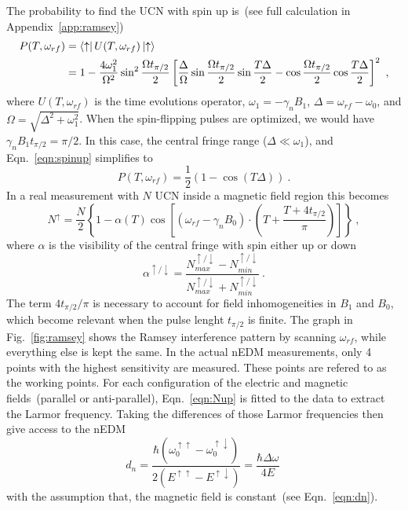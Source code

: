 The probability to find the UCN with spin up is~(see full calculation
in Appendix~\ref{app:ramsey})
\begin{align}
  \label{eqn:spinup}
  P(T, \omega_{rf}) &= \bra{\uparrow} U(T, \omega_{rf}) \ket{\uparrow} \\ \nonumber
  &= 1 - \frac{4 \omega_1^2}{\Omega^2} \sin ^2 \frac{\Omega t_{\pi/2}}{2} \left[ \frac{\Delta}{\Omega} \sin  \frac{\Omega t_{\pi/2}}{2} \sin \frac{T\Delta}{2} - \cos  \frac{\Omega t_{\pi/2}}{2} \cos\frac{T\Delta}{2} \right]^2~,
\end{align}
where $U(T, \omega_{rf})$ is the time evolutions operator,
$\omega_1 = - \gamma_n B_1$, $\Delta = \omega_{rf} - \omega_0$, and
$\Omega = \sqrt{\Delta^2 + \omega_1^2}$. When the spin-flipping pulses
are optimized, we would have $\gamma_n B_1 t_{\pi/2} = \pi / 2$. In
this case, the central fringe range ($\Delta \ll \omega_1$), and
Eqn.~\ref{eqn:spinup} simplifies to
\begin{equation}
  P(T, \omega_{rf}) = \frac{1}{2} \left( 1 - \cos(T\Delta) \right)~.
\end{equation}
In a real measurement with $N$ UCN inside a magnetic field region this
becomes
\begin{equation}
  \label{eqn:Nup}
N^{\uparrow} = \frac{N}{2} \left\lbrace 1 - \alpha(T) \cos \left[ (\omega_{rf} - \gamma_n B_0 ) \cdot \left(T+\frac{T+4t_{\pi/2}}{\pi}\right)\right]\right\rbrace~,
\end{equation}
where $\alpha$ is the visibility of the central fringe with spin
either up or down
\begin{equation}
  \label{eqn:visibility}
  \alpha^{\uparrow /\downarrow} = \frac{N_{max}^{\uparrow /\downarrow} - N_{min}^{\uparrow /\downarrow}}{N_{max}^{\uparrow /\downarrow}+ N_{min}^{\uparrow /\downarrow}}~.
\end{equation}
The term $4t_{\pi/2}/\pi$ is necessary to account for field
inhomogeneities in $B_1$ and $B_0$, which become relevant when the
pulse lenght $t_{\pi/2}$ is finite. The graph in Fig.~\ref{fig:ramsey}
shows the Ramsey interference pattern by scanning $\omega_{rf}$, while
everything else is kept the same. In the actual nEDM measurements, only 4
points with the highest sensitivity are measured. These points are
refered to as the working points. For each configuration of the
electric and magnetic fields~(parallel or anti-parallel),
Eqn.~\ref{eqn:Nup} is fitted to the data to extract the Larmor
frequency. Taking the differences of those Larmor frequencies then
give access to the nEDM
\begin{equation}
  \label{eqn:fitteddn}
  d_n = \frac{\hbar (\omega_0 ^{\uparrow \uparrow} - \omega_0 ^{\uparrow \downarrow})}{2(E^{\uparrow \uparrow} - E^{\uparrow \downarrow})} = \frac{\hbar \Delta \omega}{4E}~
\end{equation}
with the assumption that, the magnetic field is constant~(see
Eqn.~\ref{eqn:dn}).


